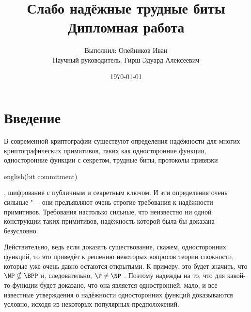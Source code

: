 \documentclass[oneside, a4paper]{article}
\theoremstyle{definition}
\theoremstyle{remark}
\begin{document}
\title{Слабо надёжные трудные биты \\ \large Дипломная работа}
\author{\normalsize Выполнил: Олейников Иван \\ \normalsize Научный руководитель: Гирш Эдуард Алексеевич}
\date{\today}
\maketitle


\tableofcontents

\section{Введение}

В современной криптографии существуют определения надёжности для
многих криптографических примитивов, таких как односторонние функции,
односторонние функции с секретом, трудные биты, протоколы привязки
\begin{foreignlanguage}{english}(bit commitment)\end{foreignlanguage},
шифрование с публичным и секретным ключом. И эти определения очень сильные "---
они предъявляют очень строгие требования к надёжности примитивов. Требования
настолько сильные, что неизвестно ни одной конструкции таких примитивов,
надёжность которой была бы доказана безусловно.

Действительно, ведь если доказать существование, скажем, односторонних функций,
то это приведёт к решению некоторых вопросов теории сложности, которые уже очень
давно остаются открытыми. К примеру, это будет значить, что $\NP \nsubseteq
\BPP$ и, следовательно, $\P \neq \NP$ \cite{goldreich}. Поэтому надежды на то,
что для какой-то функции будет доказано, что она является одностронней, мало,
и все известные утверждения о надёжности односторонних функций доказываются
условно, исходя из некоторых популярных предположений.
\end{document}
